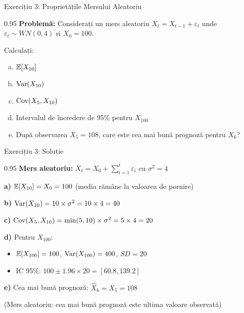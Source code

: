 \documentclass[9pt, aspectratio=169, t]{beamer}
\begin{document}
\begin{frame}{Exercițiu 3: Proprietățile Mersului Aleatoriu}
    \begin{cminipage}{0.95\textwidth}
    \textbf{Problemă:} Considerați un mers aleatoriu $X_t = X_{t-1} + \varepsilon_t$ unde $\varepsilon_t \sim WN(0, 4)$ și $X_0 = 100$.

    \vspace{0.4cm}

    Calculați:
    \begin{enumerate}[a)]\setlength{\itemsep}{0pt}
        \item $\mathbb{E}[X_{10}]$
        \item $\text{Var}(X_{10})$
        \item $\text{Cov}(X_5, X_{10})$
        \item Intervalul de încredere de 95\% pentru $X_{100}$
        \item După observarea $X_5 = 108$, care este cea mai bună prognoză pentru $X_6$?
    \end{enumerate}
    \end{cminipage}
\end{frame}

\begin{frame}{Exercițiu 3: Soluție}
    \begin{cminipage}{0.95\textwidth}
    \textbf{Mers aleatoriu:} $X_t = X_0 + \sum_{i=1}^{t} \varepsilon_i$ cu $\sigma^2 = 4$

    \vspace{0.3cm}

    \textbf{a)} $\mathbb{E}[X_{10}] = X_0 = 100$ \quad (media rămâne la valoarea de pornire)

    \vspace{0.2cm}

    \textbf{b)} $\text{Var}(X_{10}) = 10 \times \sigma^2 = 10 \times 4 = 40$

    \vspace{0.2cm}

    \textbf{c)} $\text{Cov}(X_5, X_{10}) = \min(5, 10) \times \sigma^2 = 5 \times 4 = 20$

    \vspace{0.2cm}

    \textbf{d)} Pentru $X_{100}$:
    \begin{itemize}\setlength{\itemsep}{0pt}
        \item $\mathbb{E}[X_{100}] = 100$, $\text{Var}(X_{100}) = 400$, $SD = 20$
        \item IC 95\%: $100 \pm 1.96 \times 20 = [60.8, 139.2]$
    \end{itemize}

    \vspace{0.2cm}

    \textbf{e)} Cea mai bună prognoză: $\hat{X}_6 = X_5 = 108$

    {\small (Mers aleatoriu: cea mai bună prognoză este ultima valoare observată)}
    \end{cminipage}
\end{frame}
\end{document}
